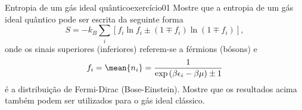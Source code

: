 \begin{exercício}{Entropia de um gás ideal quântico}{exercício01}
    Mostre que a entropia de um gás ideal quântico pode ser escrita da seguinte forma
    \begin{equation*}
        S = - k_B \sum_{i} \left[f_i \ln f_i \pm (1 \mp f_i)\ln(1 \mp f_i)\right],
    \end{equation*}
    onde os sinais superiores (inferiores) referem-se a férmions (bósons) e
    \begin{equation*}
        f_i = \mean{n_i} = \frac1{\exp\left(\beta \epsilon_i - \beta \mu\right) \pm 1}
    \end{equation*}
    é a distribuição de Fermi-Dirac (Bose-Einstein). Mostre que os resultados acima também podem ser utilizados para o gás ideal clássico.
\end{exercício}
